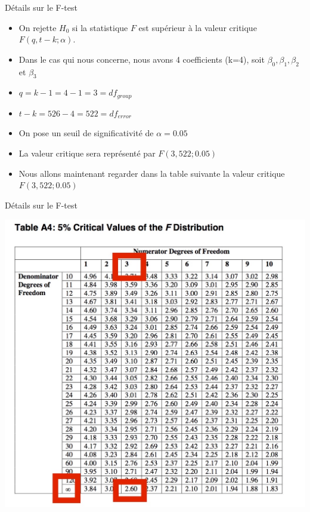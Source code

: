 \documentclass{beamer}
\begin{document}
\begin{frame}{Détails sur le F-test}
\begin{itemize}
\item On rejette $H_0$ si la statistique $F$ est supérieur à la valeur critique $F(q,t-k;\alpha)$.
\item Dans le cas qui nous concerne, nous avons 4 coefficients (k=4), soit $\beta_0, \beta_1, \beta_2$ et $\beta_3$
\item $q=k-1=4-1=3= df_{group}$
\item $t-k=526-4=522= df_{error}$
\item On pose un seuil de significativité de $\alpha=0.05$
\item La valeur critique sera représenté par $F(3,522;0.05)$
\item Nous allons maintenant regarder dans la table suivante la valeur critique $F(3,522;0.05)$
\end{itemize}
\end{frame}

\begin{frame}{Détails sur le F-test}
\begin{center}
\includegraphics[scale=.2]{ftable}
\end{center}
\end{frame}
\end{document}

